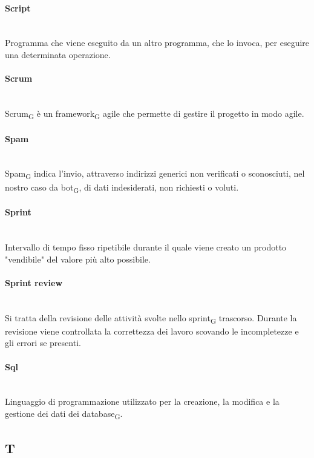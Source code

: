 \paragraph{Script}~\smallskip \\
Programma che viene eseguito da un altro programma, che lo invoca, per eseguire una determinata operazione.

\paragraph{Scrum}~\smallskip \\
Scrum\textsubscript{G} è un framework\textsubscript{G} agile che permette di gestire il progetto in modo agile.

\paragraph{Spam}~\smallskip \\
Spam\textsubscript{G} indica l'invio, attraverso indirizzi generici non verificati o sconosciuti, nel nostro caso da bot\textsubscript{G}, di dati indesiderati, non richiesti o voluti.

\paragraph{Sprint}~\smallskip \\
Intervallo di tempo fisso ripetibile durante il quale viene creato un prodotto "vendibile" del valore più alto possibile.

\paragraph{Sprint review}~\smallskip \\
Si tratta della revisione delle attività svolte nello sprint\textsubscript{G} trascorso. Durante la revisione viene controllata la correttezza
dei lavoro scovando le incompletezze e gli errori se presenti.

\paragraph{Sql}~\smallskip \\
Linguaggio di programmazione utilizzato per la creazione, la modifica e la gestione dei dati dei database\textsubscript{G}.
\newpage
{}
\subsection*{T}

